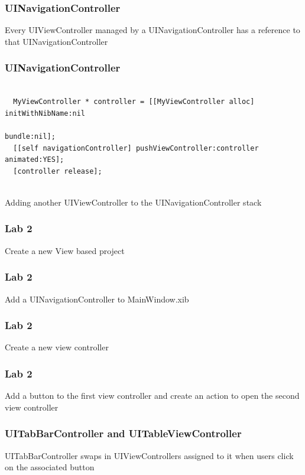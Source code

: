 \documentclass[10pt]{beamer}
\begin{document}
\begin{frame}[fragile]
  \frametitle{UINavigationController}
  Every UIViewController managed by a UINavigationController has a reference to that UINavigationController

\end{frame}

\begin{frame}[fragile]
  \frametitle{UINavigationController}
  \begin{listing}[H]
    \begin{verbatim}
  
  MyViewController * controller = [[MyViewController alloc] initWithNibName:nil
                                                            bundle:nil];
  [[self navigationController] pushViewController:controller animated:YES];
  [controller release];
              
  \end{verbatim}
    \caption{Adding another UIViewController to the UINavigationController stack}
    \label{listing:25}
  \end{listing}

\end{frame}

    
\begin{frame}[fragile]
  \frametitle{Lab 2}
  Create a new View based project

\end{frame}

\begin{frame}[fragile]
  \frametitle{Lab 2}
  Add a UINavigationController to MainWindow.xib

\end{frame}

\begin{frame}[fragile]
  \frametitle{Lab 2}
  Create a new view controller

\end{frame}

\begin{frame}[fragile]
  \frametitle{Lab 2}
  Add a button to the first view controller and create an action to open the second view controller

\end{frame}

    
\begin{frame}[fragile]
  \frametitle{UITabBarController and UITableViewController}
  UITabBarController swaps in UIViewControllers assigned to it when users click on the associated button

\end{frame}
\end{document}
